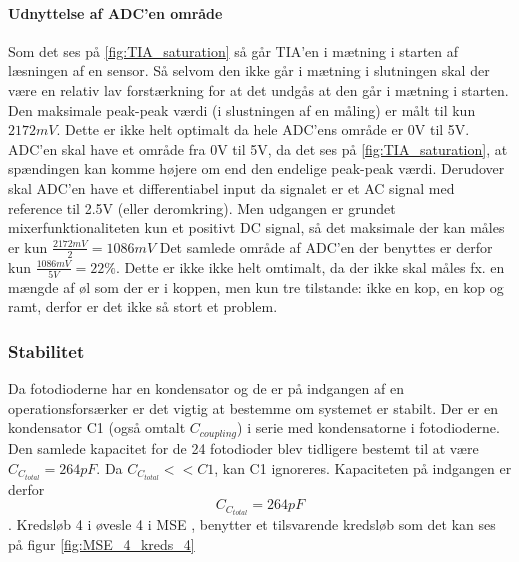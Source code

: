 \documentclass[HardwareDesign/HardwareDesign_main.tex]{subfiles}
\begin{document}
{\paragraph{Udnyttelse af ADC'en område}
Som det ses på \ref{fig:TIA_saturation} så går TIA'en i mætning i starten af læsningen af en sensor. Så selvom den ikke går i mætning i slutningen skal der være en relativ lav forstærkning for at det undgås at den går i mætning i starten. Den maksimale peak-peak værdi (i slustningen af en måling) er målt til kun $2172\si{mV}$. Dette er ikke helt optimalt da hele ADC'ens område er 0V til 5V. ADC'en skal have et område fra 0V til 5V, da det ses på \ref{fig:TIA_saturation}, at spændingen kan komme højere om end den endelige peak-peak værdi. Derudover skal ADC'en have et differentiabel input da signalet er et AC signal med reference til 2.5V (eller deromkring). Men udgangen er grundet mixerfunktionaliteten kun et positivt DC signal, så det maksimale der kan måles er kun $\frac{2172\si{mV}}{2} = 1086\si{mV}$ Det samlede område af ADC'en der benyttes er derfor kun $\frac{1086\si{mV}}{5\si{V}} = 22\%$. Dette er ikke ikke helt omtimalt, da der ikke skal måles fx. en mængde af øl som der er i koppen, men kun tre tilstande: ikke en kop, en kop og ramt, derfor er det ikke så stort et problem.
}

\subsubsection{Stabilitet}

Da fotodioderne har en kondensator og de er på indgangen af en operationsforsærker er det vigtig at bestemme om systemet er stabilt. Der er en kondensator C1 (også omtalt $C_{coupling}$) i serie med kondensatorne i fotodioderne. Den samlede kapacitet for de 24 fotodioder blev tidligere bestemt til at være $C_{C_{total}} = 264\si{pF}$. Da $C_{C_{total}} << C1$, kan C1 ignoreres. Kapaciteten på indgangen er derfor $$C_{C_{total}} = 264\si{pF}$$. 
Kredsløb 4 i øvesle 4 i MSE \autocite[12]{MSE_EXC_4}, benytter et tilsvarende kredsløb som det kan ses på figur \ref{fig:MSE_4_kreds_4}
\end{document}
